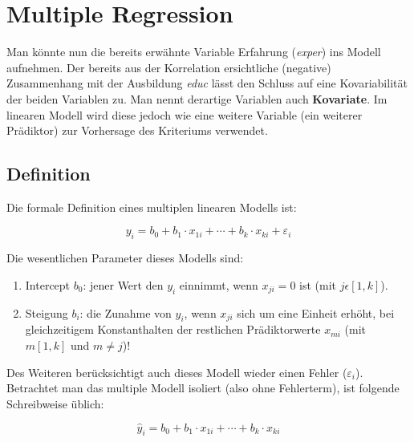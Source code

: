 \documentclass[]{article}
\providecommand{\tightlist}{%
  \setlength{\itemsep}{0pt}\setlength{\parskip}{0pt}}
\begin{document}
\section*{Multiple Regression}\label{multiple-regression}

Man könnte nun die bereits erwähnte Variable Erfahrung (\emph{exper})
ins Modell aufnehmen. Der bereits aus der Korrelation ersichtliche
(negative) Zusammenhang mit der Ausbildung \emph{educ} lässt den Schluss
auf eine Kovariabilität der beiden Variablen zu. Man nennt derartige
Variablen auch \textbf{Kovariate}. Im linearen Modell wird diese jedoch
wie eine weitere Variable (ein weiterer Prädiktor) zur Vorhersage des
Kriteriums verwendet.

\subsection*{Definition}\label{definition}

Die formale Definition eines multiplen linearen Modells ist:

\begin{equation} 
  y_i = b_0 + b_1 \cdot x_{1i} + \cdots + b_k \cdot x_{ki} + \varepsilon_i
  \label{eq:LinModMultFehler}
\end{equation}

Die wesentlichen Parameter dieses Modells sind:

\begin{enumerate}
\def\labelenumi{\arabic{enumi}.}
\tightlist
\item
  Intercept \(b_0\): jener Wert den \(y_i\) einnimmt, wenn
  \(x_{ji} = 0\) ist (mit \(j \epsilon [1,k]\)).
\item
  Steigung \(b_i\): die Zunahme von \(y_i\), wenn \(x_{ji}\) sich um
  eine Einheit erhöht, bei gleichzeitigem Konstanthalten der restlichen
  Prädiktorwerte \(x_{mi}\) (mit \(m [1,k]\) und \(m \ne j\))!
\end{enumerate}

Des Weiteren berücksichtigt auch dieses Modell wieder einen Fehler
(\(\varepsilon_i\)). Betrachtet man das multiple Modell isoliert (also
ohne Fehlerterm), ist folgende Schreibweise üblich:

\begin{equation} 
  \hat{y}_i = b_0 + b_1 \cdot x_{1i} + \cdots + b_k \cdot x_{ki}
  \label{eq:LinModMult}
\end{equation}
\end{document}
